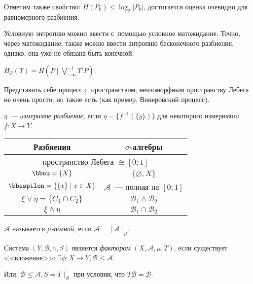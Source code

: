 \documentclass{article}
\begin{document}
Отметим также свойство: $H(P_0) \le \log_2 |P_0|$, достигается оценка очевидно
для равномерного разбиения.

Условную энтропию можно ввести с~помощью условное матожидание. Точно, через
матожидание, также можно ввести энтропию бесконечного разбиения, однако, она уже
не обязана быть конечной.

\begin{theorem}
	$H_P(T) = H(P \mid \bigvee\limits_{-\infty}^{-1} T^{i} P)$.
\end{theorem}

\begin{remark}
	Представить себе процесс с~пространством, неизоморфным пространству Лебега не
	очень просто, но такие есть (как пример, Винеровский процесс).
\end{remark}

\begin{definition}
	$\eta$~--- \emph{измеримое разбиение}, если $\eta = \{f^{-1}(\{y\})\}$ для
	некоторого измеримого $f: X \rightarrow Y$.
\end{definition}

\begin{center}
	\begin{tabular}{|c|c|}
		\hline
		Разбиения & $\sigma$-алгебры\\
		\hline
		\multicolumn{2}{|c|}{пространство Лебега $\cong [0; 1]$ }\\
		\hline
		$\bbnu = \{X\}$ & $\{\varnothing, X\}$\\
		\hline
		$\bbespilon = \{\{x\}\mid x \in X\}$ & $\mathcal{A}$~--- полная на $[0;1]$\\
		\hline
		$\xi \lor \eta = \{C_1 \cap C_2\}$ & $\mathcal{B}_1 \land \mathcal{B}_2$\\
		\hline
		$\xi \land \eta$ & $\mathcal{B}_1 \cap \mathcal{B}_2$\\
		\hline
	\end{tabular}
\end{center}

\begin{definition}
	$\mathcal{A}$ называется \emph{$\mu$-полной}, если $\mathcal{A} =
	[\mathcal{A}]_\mu$.
\end{definition}
\begin{definition}
	Система $(Y, \mathcal{B}, \gamma, S)$ является \emph{фактором}
	$(X, \mathcal{A}, \mu, T)$, если существует <<вложение>>:
	$\exists \phi: X \rightarrow Y, \mathcal{B} \le \mathcal{A}$.

	Или: $\mathcal{B} \le \mathcal{A}, S = T\mid_\mathcal{B}$ при условии, что
	$T\mathcal{B} = \mathcal{B}$.
\end{definition}
\end{document}
